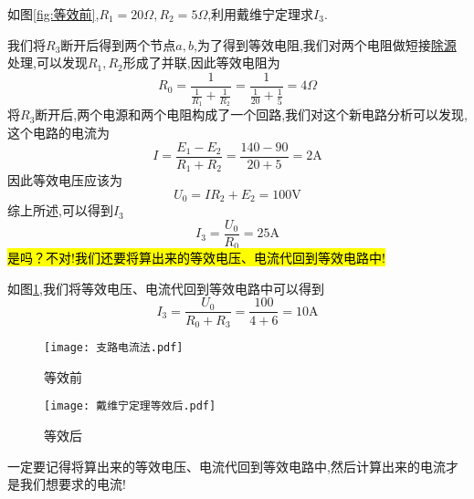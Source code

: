 \begin{example}
    如图\ref{fig:等效前},$R_1=20\Omega ,R_2=5\Omega $,利用戴维宁定理求$I_3$.
\end{example}
\begin{solution}
    我们将$R_3$断开后得到两个节点$a,b$,为了得到等效电阻,我们对两个电阻做短接\hyperlink{除源}{除源}处理,可以发现$R_1,R_2$形成了并联,因此等效电阻为
    \begin{equation*}
        R_0=\frac{1}{\frac{1}{R_1}+\frac{1}{R_2}}=\frac{1}{\frac{1}{20}+\frac{1}{5}}=4\Omega 
    \end{equation*}
    将$R_3$断开后,两个电源和两个电阻构成了一个回路,我们对这个新电路分析可以发现,这个电路的电流为
    \begin{equation*}
        I=\frac{E_1-E_2}{R_1+R_2}=\frac{140-90}{20+5}=2\mathrm{A}
    \end{equation*}
    因此等效电压应该为
    \begin{equation*}
        U_0=IR_2+E_2=100\mathrm{V}
    \end{equation*}
    综上所述,可以得到$I_3$
    \begin{equation*}
        I_3=\frac{U_0}{R_0}=25\mathrm{A}
    \end{equation*}
    \hl{是吗？不对!我们还要将算出来的等效电压、电流代回到等效电路中!}

    如图\ref{fig:等效后},我们将等效电压、电流代回到等效电路中可以得到
    \begin{equation*}
        I_3=\frac{U_0}{R_0+R_3}=\frac{100}{4+6}=10\mathrm{A}
    \end{equation*}
    \begin{figure}[htbp]
        \centering
        \begin{minipage}{0.48\textwidth}
            \centering
            \texttt{[image: 支路电流法.pdf]}
            \caption{等效前}
            \label{fig:等效前}
        \end{minipage}
        \begin{minipage}{0.48\textwidth}
            \centering
            \texttt{[image: 戴维宁定理等效后.pdf]}
            \caption{等效后}
            \label{fig:等效后}
        \end{minipage}
    \end{figure}
\end{solution}
\begin{remark}
    一定要记得将算出来的等效电压、电流代回到等效电路中,然后计算出来的电流才是我们想要求的电流!
\end{remark}

